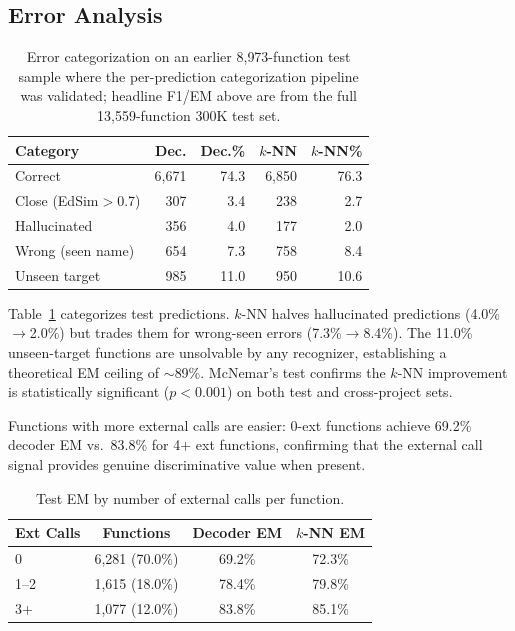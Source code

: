 \documentclass[sigconf,nonacm]{acmart}
\begin{document}
\subsection{Error Analysis}

\begin{table}[t]
    \centering
    \caption{Error categorization on an earlier 8{,}973-function test sample where the per-prediction categorization pipeline was validated; headline F1/EM above are from the full 13{,}559-function 300K test set.}
    \label{tab:errors}
    \footnotesize
    \begin{tabular}{lrrrr}
        \toprule
        \textbf{Category} & \textbf{Dec.} & \textbf{Dec.\%} & \textbf{$k$-NN} & \textbf{$k$-NN\%} \\
        \midrule
        Correct & 6,671 & 74.3 & 6,850 & 76.3 \\
        Close (EdSim${>}$0.7) & 307 & 3.4 & 238 & 2.7 \\
        Hallucinated & 356 & 4.0 & 177 & 2.0 \\
        Wrong (seen name) & 654 & 7.3 & 758 & 8.4 \\
        Unseen target & 985 & 11.0 & 950 & 10.6 \\
        \bottomrule
    \end{tabular}
\end{table}

Table~\ref{tab:errors} categorizes test predictions. $k$-NN halves hallucinated predictions (4.0\%$\to$2.0\%) but trades them for wrong-seen errors (7.3\%$\to$8.4\%). The 11.0\% unseen-target functions are unsolvable by any recognizer, establishing a theoretical EM ceiling of ${\sim}$89\%. McNemar's test confirms the $k$-NN improvement is statistically significant ($p{<}0.001$) on both test and cross-project sets.

Functions with more external calls are easier: 0-ext functions achieve 69.2\% decoder EM vs.\ 83.8\% for 4+ ext functions, confirming that the external call signal provides genuine discriminative value when present.

\begin{table}[t]
    \centering
    \caption{Test EM by number of external calls per function.}
    \label{tab:ext_buckets}
    \footnotesize
    \begin{tabular}{lccc}
        \toprule
        \textbf{Ext Calls} & \textbf{Functions} & \textbf{Decoder EM} & \textbf{$k$-NN EM} \\
        \midrule
        0 & 6,281 (70.0\%) & 69.2\% & 72.3\% \\
        1--2 & 1,615 (18.0\%) & 78.4\% & 79.8\% \\
        3+ & 1,077 (12.0\%) & 83.8\% & 85.1\% \\
        \bottomrule
    \end{tabular}
\end{table}
\end{document}
